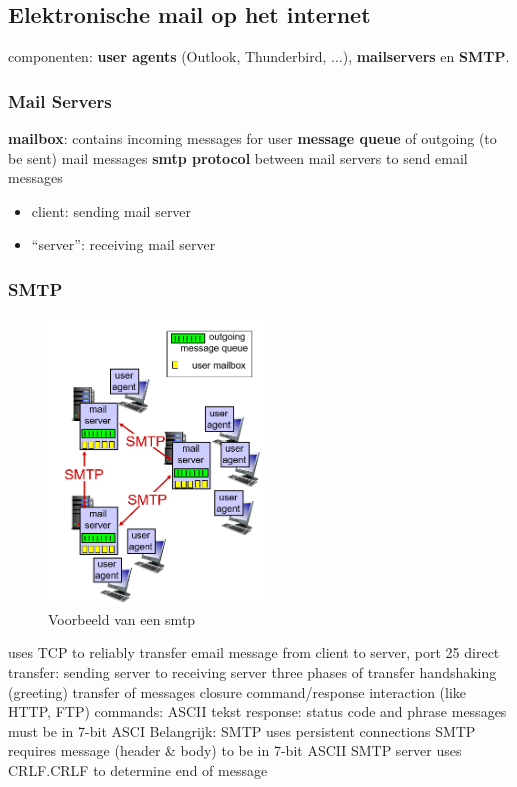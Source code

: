 \subsection{Elektronische mail op het internet}

 componenten: \textbf{user agents} (Outlook, Thunderbird, ...), \textbf{mailservers} en \textbf{SMTP}.

\subsubsection{Mail Servers}

\noindent \textbf{\Gls{mailbox}}: contains incoming messages for user
\textbf{message queue} of outgoing (to be sent) mail messages
\textbf{\acrshort{smtp} protocol} between mail servers to send email messages
\begin{itemize}
    \item client: sending mail server
    \item “server”: receiving mail server
\end{itemize}

\newpage

\subsubsection{SMTP}

\begin{figure}[h]
\centering
\includegraphics[height=3in]{./img/imghfdst2/hdst2puntje8.png}
\caption{Voorbeeld van een smtp }
\label{fig:smtp}
\end{figure}


\bi
\itf uses TCP to reliably transfer email message from client to server, port 25
\itf direct transfer: sending server to receiving server
\itf three phases of transfer
    \bi
    \itf handshaking (greeting)
    \itf transfer of messages
    \itf closure
    \ei
\itf command/response interaction (like HTTP, FTP)
    \bi
    \itf commands: ASCII tekst
    \itf response: status code and phrase
    \ei
\itf messages must be in 7-bit ASCI
\ei
\noindent Belangrijk:
\bi
\itf SMTP uses persistent connections
\itf SMTP requires message (header \& body) to be in 7-bit ASCII
\itf SMTP server uses CRLF.CRLF to determine end of message
\ei

